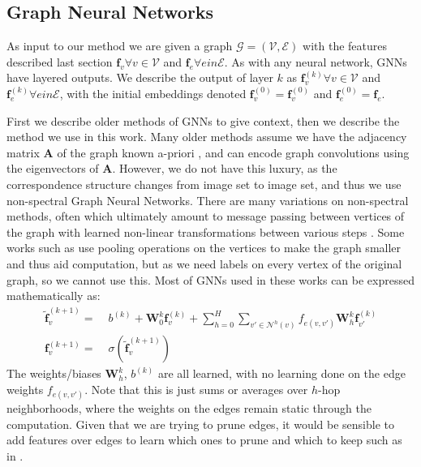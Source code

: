 \documentclass[10pt,twocolumn,letterpaper]{article}
\newcommand{\mat}[1]{\mathbf{#1}}
\begin{document}
\subsection{Graph Neural Networks}
As input to our method we are given a graph $\mathcal{G} = (\mathcal{V}, \mathcal{E})$ with the features described last section $\mat{f}_v \forall v \in \mathcal{V}$ and $\mat{f}_e \forall e in \mathcal{E}$.
As with any neural network, GNNs have layered outputs.
We describe the output of layer $k$ as $\mat{f}_v^{(k)} \forall v \in \mathcal{V}$ and $\mat{f}_e^{(k)} \forall e in \mathcal{E}$, with the initial embeddings denoted $\mat{f}_v^{(0)} = \mat{f}_v^{(0)}$ and $\mat{f}_e^{(0)} = \mat{f}_e$.

First we describe older methods of GNNs to give context, then we describe the method we use in this work.
Many older methods assume we have the adjacency matrix $\mat{A}$ of the graph known a-priori \cite{bruna2013spectral}, and can encode graph convolutions using the eigenvectors of $\mat{A}$.
However, we do not have this luxury, as the correspondence structure changes from image set to image set, and thus we use non-spectral Graph Neural Networks.
There are many variations on non-spectral methods, often which ultimately amount to message passing between vertices of the graph with learned non-linear transformations between various steps \cite{kipf2017semi, defferrard2016convolutional, gama2018mimo, gama2018convolutional}.
Some works such as \cite{gama2019convolutional} use pooling operations on the vertices to make the graph smaller and thus aid computation, but as we need labels on every vertex of the original graph, so we cannot use this.
Most of GNNs used in these works can be expressed mathematically as:
\begin{align*}
\mat{\tilde{f}}_v^{(k+1)} =&\; b^{(k)} + \mat{W}_0^{k} \mat{f}_{v}^{(k)} + \sum_{h=0}^H \sum_{v' \in \mathcal{N}^{h}(v)} f_{e(v,v')} \mat{W}_{h}^{k} \mat{f}_{v'}^{(k)} \\
\mat{f}_v^{(k+1)} =&\; \sigma\left(\mat{\tilde{f}}_v^{(k+1)}\right)
\end{align*}
The weights/biases $\mat{W}_{h}^{k}$, $b^{(k)}$ are all learned, with no learning done on the edge weights $f_{e(v,v')}$. 
Note that this is just sums or averages over $h$-hop neighborhoods, where the weights on the edges remain static through the computation.
Given that we are trying to prune edges, it would be sensible to add features over edges to learn which ones to prune and which to keep such as in \cite{scarselli2009graph}.
\end{document}

